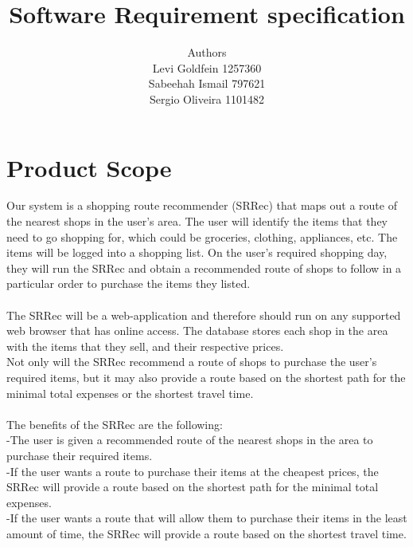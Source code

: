 \documentclass[12pt]{article}
\newenvironment{Project}[2][Project]{\begin{trivlist}
\item[\hskip \labelsep {\bfseries #1}\hskip \labelsep {\bfseries #2.}]}{\end{trivlist}}
\begin{document}
 
 
\title{Software Requirement specification }
\author{Authors\\Levi Goldfein 1257360\\Sabeehah Ismail 797621\\ Sergio Oliveira 1101482}
\maketitle
 
\begin{Project}{: Shopping Route Recommender}

\end{Project}
\section{Product Scope} 
Our system is a shopping route recommender (SRRec) that maps out a route of the nearest shops in the user's area. The user will identify the items that they need to go shopping for, which could be groceries, clothing, appliances, etc. The items will be logged into a shopping list. On the user's required shopping day, they will run the SRRec and obtain a recommended route of shops to follow in a particular order to purchase the items they listed.\\\\
The SRRec will be a web-application and therefore should run on any supported web browser that has online access. The database stores each shop in the area with the items that they sell, and their respective prices.\\
Not only will the SRRec recommend a route of shops to purchase the user's required items, but it may also provide a route based on the shortest path for the minimal total expenses or the shortest travel time.\\\\
The benefits of the SRRec are the following:\\
-The user is given a recommended route of the nearest shops in the area to purchase their required items.\\
-If the user wants a route to purchase their items at the cheapest prices, the SRRec will provide a route based on the shortest path for the minimal total expenses.\\
-If the user wants a route that will allow them to purchase their items in the least amount of time, the SRRec will provide a route based on the shortest travel time.
\end{document}
